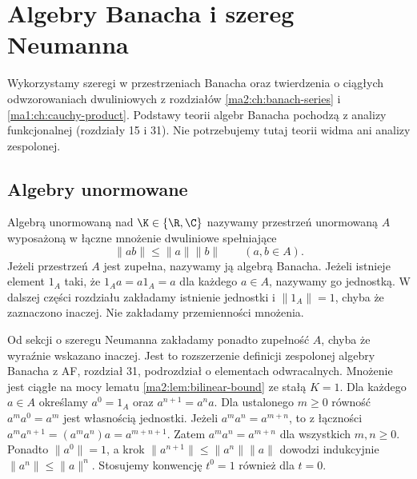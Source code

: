 \chapter{Algebry Banacha i szereg Neumanna}
\label{ma2:ch:banach-algebras}

Wykorzystamy szeregi w przestrzeniach Banacha oraz
twierdzenia o ciągłych odwzorowaniach dwuliniowych
z rozdziałów \ref{ma2:ch:banach-series}
i \ref{ma1:ch:cauchy-product}.
Podstawy teorii algebr Banacha pochodzą z analizy
funkcjonalnej (rozdziały 15 i 31). Nie potrzebujemy
tutaj teorii widma ani analizy zespolonej.

\section{Algebry unormowane}

\begin{definicja}
\label{ma2:def:normed-algebra}
\label{def:banach-algebra31}
Algebrą unormowaną nad $\K\in\{\R,\C\}$ nazywamy
przestrzeń unormowaną $A$ wyposażoną w łączne
mnożenie dwuliniowe spełniające
\[
 \|ab\|\le\|a\|\|b\|\qquad(a,b\in A).
\]
Jeżeli przestrzeń $A$ jest zupełna, nazywamy ją
algebrą Banacha. Jeżeli istnieje element $1_A$
taki, że $1_Aa=a1_A=a$ dla każdego $a\in A$,
nazywamy go jednostką. W dalszej części rozdziału
zakładamy istnienie jednostki i $\|1_A\|=1$,
chyba że zaznaczono inaczej. Nie zakładamy
przemienności mnożenia.
\end{definicja}
Od sekcji o szeregu Neumanna zakładamy ponadto
zupełność $A$, chyba że wyraźnie wskazano inaczej.
Jest to rozszerzenie definicji zespolonej algebry
Banacha z AF, rozdział 31, podrozdział o elementach
odwracalnych. Mnożenie jest ciągłe na mocy lematu
\ref{ma2:lem:bilinear-bound} ze stałą $K=1$.
Dla każdego $a\in A$ określamy $a^0=1_A$ oraz
$a^{n+1}=a^na$. Dla ustalonego $m\ge0$ równość $a^ma^0=a^m$
jest własnością jednostki. Jeżeli $a^ma^n=a^{m+n}$,
to z łączności
$a^ma^{n+1}=(a^ma^n)a=a^{m+n+1}$.
Zatem $a^ma^n=a^{m+n}$ dla wszystkich $m,n\ge0$.
Ponadto $\|a^0\|=1$, a krok
$\|a^{n+1}\|\le\|a^n\|\|a\|$ dowodzi indukcyjnie
$\|a^n\|\le\|a\|^n$. Stosujemy konwencję
$t^0=1$ również dla $t=0$.


